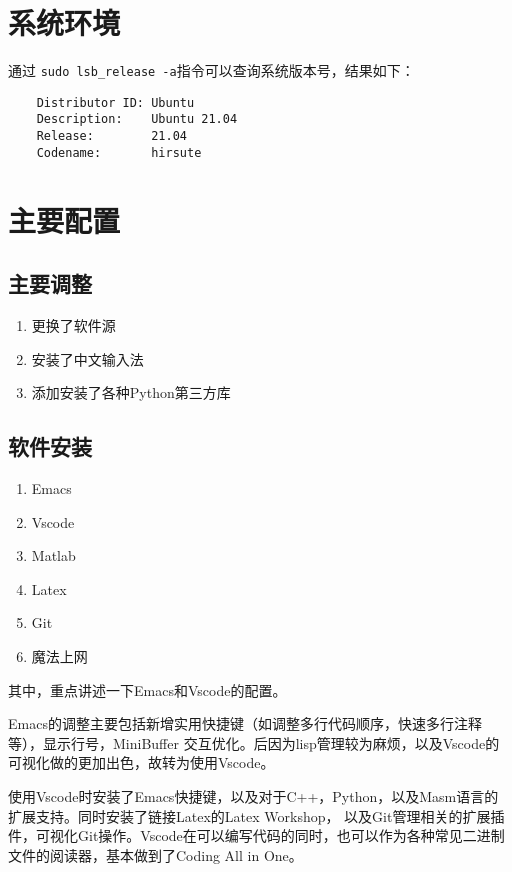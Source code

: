 \newpage
\section{系统环境}
通过 \verb|sudo lsb_release -a|指令\cite{kerrisk2010linux}可以查询系统版本号，结果如下： \begin{verbatim}
    Distributor ID: Ubuntu
    Description:    Ubuntu 21.04
    Release:        21.04
    Codename:       hirsute
\end{verbatim}

\section{主要配置}
\subsection{主要调整}
    \begin{enumerate}
        \item 更换了软件源
        \item 安装了中文输入法
        \item 添加安装了各种Python第三方库
    \end{enumerate}
\subsection{软件安装}
\begin{enumerate}
    \item Emacs
    \item Vscode
    \item Matlab
    \item Latex
    \item Git
    \item 魔法上网
\end{enumerate}
\par 
其中，重点讲述一下Emacs和Vscode的配置。
\par 
Emacs的调整主要包括新增实用快捷键（如调整多行代码顺序，快速多行注释等），显示行号，MiniBuffer
交互优化。后因为lisp管理较为麻烦，以及Vscode的可视化做的更加出色，故转为使用Vscode。
\par 
使用Vscode时安装了Emacs快捷键，以及对于C++，Python，以及Masm语言的扩展支持。同时安装了链接Latex的Latex Workshop，
以及Git管理相关的扩展插件，可视化Git操作。Vscode在可以编写代码的同时，也可以作为各种常见二进制文件的阅读器，基本做到了Coding All in One。


